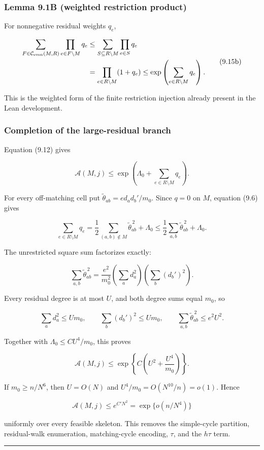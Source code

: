 \documentclass[11pt]{article}
\begin{document}
\subsubsection{Lemma 9.1B (weighted restriction product)}\label{lemma-9.1b-weighted-restriction-product}

For nonnegative residual weights \(q_e\),

\[
 \begin{split}
 \sum_{F\in\mathcal C_{\rm even}(M,R)}
      \prod_{e\in F\setminus M}q_e
 &\le\sum_{S\subseteq R\setminus M}\prod_{e\in S}q_e\\
 &=\prod_{e\in R\setminus M}(1+q_e)
 \le\exp\left(\sum_{e\in R\setminus M}q_e\right).
 \end{split}
 \tag{9.15b}
\]

This is the weighted form of the finite restriction injection already present in the Lean development.

\subsubsection{Completion of the large-residual branch}\label{completion-of-the-large-residual-branch}

Equation (9.12) gives

\[
 \mathcal A(M,j)
 \le\exp\left(\Lambda_0+
   \sum_{e\in R\setminus M}q_e\right).
 \tag{9.16}
\]

For every off-matching cell put \(\widetilde\theta_{ab}=e d_ad_b'/m_0\). Since \(q=0\) on \(M\), equation (9.6) gives

\[
 \sum_{e\in R\setminus M}q_e
 =\frac12\sum_{(a,b)\notin M}\widetilde\theta_{ab}^{\,2}+\Lambda_0
 \le\frac12\sum_{a,b}\widetilde\theta_{ab}^{\,2}+\Lambda_0.
 \tag{9.17}
\]

The unrestricted square sum factorizes exactly:

\[
 \sum_{a,b}\widetilde\theta_{ab}^{\,2}
 =\frac{e^2}{m_0^2}
   \left(\sum_a d_a^2\right)
   \left(\sum_b(d_b')^2\right).
 \tag{9.18}
\]

Every residual degree is at most \(U\), and both degree sums equal \(m_0\), so

\[
 \sum_a d_a^2\le Um_0,
 \qquad
 \sum_b(d_b')^2\le Um_0,
 \qquad
 \sum_{a,b}\widetilde\theta_{ab}^{\,2}\le e^2U^2.
 \tag{9.18a}
\]

Together with \(\Lambda_0\le CU^4/m_0\), this proves

\[
 \boxed{\mathcal A(M,j)
 \le\exp\left\{C\left(U^2+\frac{U^4}{m_0}\right)\right\}.}
 \tag{9.19}
\]

If \(m_0\ge n/N^6\), then \(U=O(N)\) and \(U^4/m_0=O(N^{10}/n)=o(1)\). Hence

\[
 \mathcal A(M,j)\le e^{C'N^2}=\exp\{o(n/N^4)\}
 \tag{9.19a}
\]

uniformly over every feasible skeleton. This removes the simple-cycle partition, residual-walk enumeration, matching-cycle encoding, \(\tau\), and the \(h\tau\) term.

\begin{center}\rule{0.5\linewidth}{0.5pt}\end{center}
\end{document}
